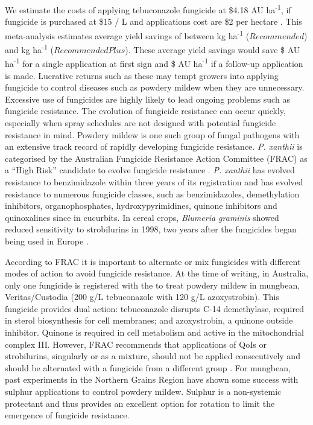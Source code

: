 \documentclass[agronomy,article,submit,moreauthors,pdftex]{mdpi}
\begin{document}
We estimate the costs of applying tebuconazole fungicide at \$4.18 AU ha\textsuperscript{-1}, if fungicide is purchased at \$15 / L \citep{Simfendorfer2011} and applications cost are \$2 per hectare \citep{QueenslandGovernment2019}.
This meta-analysis estimates average yield savings of between kg ha\textsuperscript{-1} (\(Recommended\)) and kg ha\textsuperscript{-1} (\(RecommendedPlus\)).
These average yield savings would save \$ AU ha\textsuperscript{-1} for a single application at first sign and \$ AU ha\textsuperscript{-1} if a follow-up application is made.
Lucrative returns such as these may tempt growers into applying fungicide to control diseases such as powdery mildew when they are unnecessary.
Excessive use of fungicides are highly likely to lead ongoing problems such as fungicide resistance.
The evolution of fungicide resistance can occur quickly, especially when spray schedules are not designed with potential fungicide resistance in mind.
Powdery mildew is one such group of fungal pathogens with an extensive track record of rapidly developing fungicide resistance.
\emph{P. xanthii} is categorised by the Australian Fungicide Resistance Action Committee (FRAC) as a ``High Risk'' candidate to evolve fungicide resistance \citep{FRACrisk2019}.
\emph{P. xanthii} has evolved resistance to benzimidazole within three years of its registration \citep{Peterson1973} and has evolved resistance to numerous fungicide classes, such as benzimidazoles, demethylation inhibitors, organophosphates, hydroxypyrimidines, quinone inhibitors and quinoxalines since \citep{Mcgrath2001} in cucurbits.
In cereal crops, \emph{Blumeria graminis} showed reduced sensitivity to strobilurins in 1998, two years after the fungicides began being used in Europe \citep{Chin2001}.

According to FRAC it is important to alternate or mix fungicides with different modes of action to avoid fungicide resistance.
At the time of writing, in Australia, only one fungicide is registered with the to treat powdery mildew in mungbean, Veritas/Custodia (200 g/L tebuconazole with 120 g/L azoxystrobin).
This fungicide provides dual action: tebuconazole disrupts C-14 demethylase, required in sterol biosynthesis for cell membranes; and azoxystrobin, a quinone outside inhibitor.
Quinone is required in cell metabolism and active in the mitochondrial complex III.
However, FRAC recommends that applications of QoIs or strobilurins, singularly or as a mixture, should not be applied consecutively and should be alternated with a fungicide from a different group \citep{Brent2007}.
For mungbean, past experiments in the Northern Grains Region have shown some success with sulphur applications to control powdery mildew.
Sulphur is a non-systemic protectant and thus provides an excellent option for rotation to limit the emergence of fungicide resistance.
\end{document}
